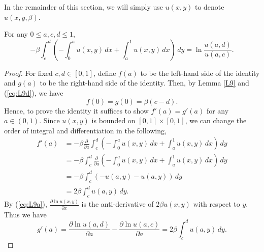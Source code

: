 In the remainder of this section, we will simply use $u(x, y)$ to denote $u(x, y, \beta)$.



\begin{lemma}\label{L6}
For any $0 \le a, c, d \le 1$,
\[
-\beta \int_{c}^{d} \left(-\int_{0}^{a} u(x, y) \, dx + \int_{a}^{1}u(x, y) \, dx \right) \, dy = \ln{\frac{u(a, d)}{u(a, c)}}.
\]
\end{lemma}

\begin{proof}
For fixed $c, d \in [0, 1]$, define $f(a)$ to be the left-hand side of the identity and $g(a)$ to be the right-hand side of the identity.
Then, by Lemma \ref{L9} and (\ref{eq:L9d}), we have
\[
f(0) = g(0) = \beta (c - d).
\]
Hence, to prove the identity it suffices to show $f'(a) = g'(a)$ for any $a \in (0, 1)$.
Since $u(x, y)$ is bounded on $[0, 1]\times[0,1]$, we can change the order of integral and differentiation in the following,
\begin{align*}
f'(a) &= -\beta \frac{\partial}{\partial a}  \int_{c}^{d} \left(-\int_{0}^{a} u(x, y) \, dx + \int_{a}^{1}u(x, y) \, dx \right) \, dy\\
      &= -\beta \int_{c}^{d} \frac{\partial}{\partial a} \left(-\int_{0}^{a} u(x, y) \, dx + \int_{a}^{1}u(x, y) \, dx \right) \, dy\\
      &= -\beta \int_{c}^{d} \left( - u(a,y) - u(a, y) \right)\, dy\\
      &= 2 \beta \int_{c}^{d} u(a,y)\, dy.
\end{align*}
By (\ref{eq:L9a}), $\frac{\partial \ln{u(x, y)}}{\partial x}$ is the anti-derivative of $2\beta u(x, y)$ with respect to $y$. Thus we have
\[
g'(a) = \frac{\partial \ln{u(a, d)}}{\partial a} - \frac{\partial \ln{u(a, c)}}{\partial a} = 2 \beta \int_{c}^{d} u(a,y)\, dy.
\]

\end{proof}












